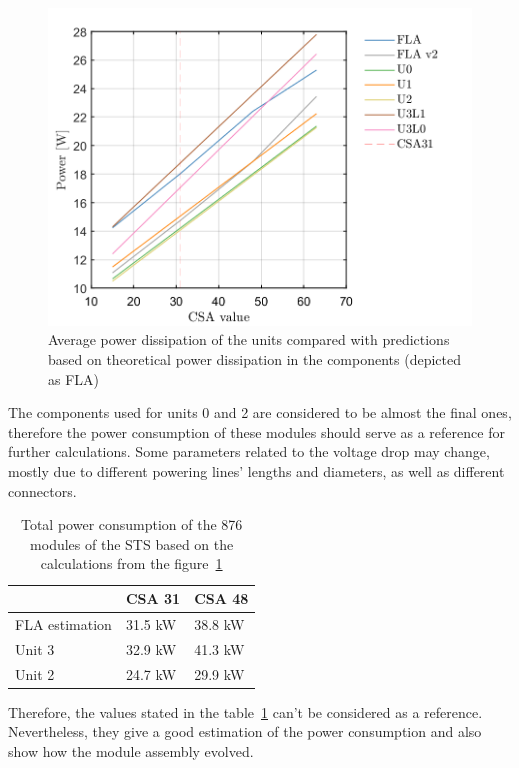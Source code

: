 \begin{figure}[h!]
\centering
\includegraphics[width=0.65\columnwidth]{Chapter5/DCS/images/theor.png}
\caption{Average power dissipation of the units compared with predictions based on theoretical power dissipation in the components (depicted as FLA)} 
\label{fig_theor}
\end{figure}
The components used for units 0 and 2 are considered to be almost the final ones, therefore the power consumption of these modules should serve as a reference for further calculations. Some parameters related to the voltage drop may change, mostly due to different powering lines' lengths and diameters, as well as different connectors. 
\begin{table}[h!]
\centering
\begin{tabular}{lll}
\hline
               & \gls{CSA} 31  & \gls{CSA} 48  \\ \hline
FLA estimation & 31.5 kW & 38.8 kW \\
Unit 3         & 32.9 kW & 41.3 kW \\
Unit 2         & 24.7 kW & 29.9 kW \\ \hline
\end{tabular}
\caption{Total power consumption of the 876 modules of the \gls{STS} based on the calculations from the figure~\ref{fig_theor}}
\label{tab:power_cons}
\end{table}
Therefore, the values stated in the table~\ref{tab:power_cons} can't be considered as a reference. Nevertheless, they give a good estimation of the power consumption and also show how the module assembly evolved. 
